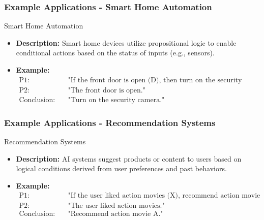 \documentclass[aspectratio=169]{beamer}
\begin{document}
\begin{frame}[fragile]
    \frametitle{Example Applications - Smart Home Automation}
    \begin{block}{Smart Home Automation}
        \begin{itemize}
            \item \textbf{Description:} Smart home devices utilize propositional logic to enable conditional actions based on the status of inputs (e.g., sensors).
            \item \textbf{Example:}
            \begin{align*}
                \text{P1:} & \quad \text{"If the front door is open (D), then turn on the security camera (C)."} \\
                \text{P2:} & \quad \text{"The front door is open."} \\
                \text{Conclusion:} & \quad \text{"Turn on the security camera."}
            \end{align*}
        \end{itemize}
    \end{block}
\end{frame}

\begin{frame}[fragile]
    \frametitle{Example Applications - Recommendation Systems}
    \begin{block}{Recommendation Systems}
        \begin{itemize}
            \item \textbf{Description:} AI systems suggest products or content to users based on logical conditions derived from user preferences and past behaviors.
            \item \textbf{Example:}
            \begin{align*}
                \text{P1:} & \quad \text{"If the user liked action movies (X), recommend action movie A."} \\
                \text{P2:} & \quad \text{"The user liked action movies."} \\
                \text{Conclusion:} & \quad \text{"Recommend action movie A."}
            \end{align*}
        \end{itemize}
    \end{block}
\end{frame}
\end{document}
